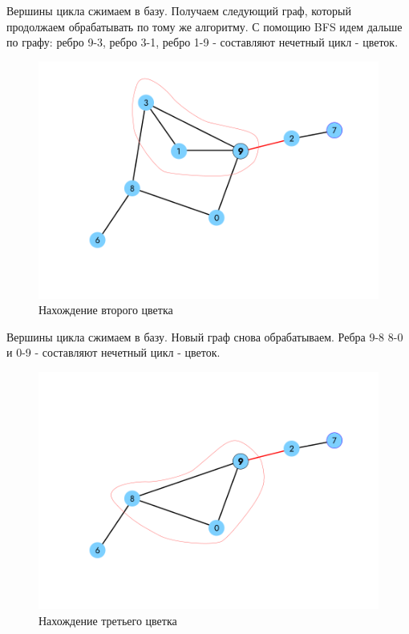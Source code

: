 \documentclass[14pt, a4paper]{extarticle}
\begin{document}
    
    Вершины цикла сжимаем в базу. Получаем следующий граф, который продолжаем обрабатывать по тому же алгоритму.
    С помощию BFS идем дальше по графу:
    ребро 9-3, ребро 3-1, ребро 1-9 - составляют нечетный цикл - цветок.

    \begin{figure}[h!]
        \centering
        \includegraphics[scale=0.3]{3.png}
        \caption{Нахождение второго цветка}
        \label{fig:my_label}
    \end{figure} 

    \pagebreak

    Вершины цикла сжимаем в базу. Новый  граф снова обрабатываем.
    Ребра 9-8 8-0 и 0-9 - составляют нечетный цикл - цветок.

    \begin{figure}[h!]
        \centering
        \includegraphics[scale=0.3]{4.png}
        \caption{Нахождение третьего цветка}
        \label{fig:my_label}
    \end{figure} 
\end{document}
